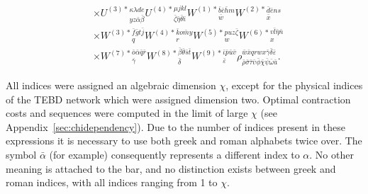 \documentclass[aps,pre,reprint,superscriptaddress,amsfonts,amsmath,showpacs,nofootinbib,floatfix]{revtex4-1}
\newcommand{\aref}[1]{Appendix~\ref{#1}}
\begin{document}
\begin{itemize}
\begin{equation}
\begin{split}
\\
&\times U^{(3)*}{}^{\kappa\lambda de}_{yz\bar\alpha\bar\beta} U^{(4)*}{}^{\mu jkl}_{\bar\zeta\bar\eta\bar\theta\bar\iota}W^{(1)*}{}^{\bar b\bar c\bar h m}_{\bar w} W^{(2)*}{}^{\bar d\bar e ns}_{\bar x}  \\
&\times W^{(3)*}{}^{\bar f\bar g t\bar j}_qW^{(4)*}{}^{\bar k o \bar m y}_r W^{(5)*}{}^{puz\bar\zeta}_w W^{(6)*}{}^{v\bar l\bar\eta\bar n}_x  \\
&\times W^{(7)*}{}^{\bar o\bar\alpha\bar q\bar r}_{\bar\gamma}W^{(8)*}{}^{\bar\beta\bar\theta\bar s\bar t}_{\bar\delta}W^{(9)*}{}^{\bar\iota\bar p\bar u\bar v}_{\bar\varepsilon}\rho^{\bar w\bar x q r w x \bar\gamma\bar\delta\bar\varepsilon}_{\bar\rho\bar\sigma\bar\tau\bar\upsilon\bar\phi\bar\chi\bar\psi\bar\omega\bar a}
\label{eq:2DTN2}.
\end{split}
\end{equation}
\end{itemize}
All indices were assigned an algebraic dimension $\chi$, except for the physical indices of the TEBD network which were assigned dimension two. Optimal contraction costs and sequences were computed in the limit of large $\chi$ (see \aref{sec:chidependency}). %
Due to the number of indices present in these expressions it is necessary to use both greek and roman alphabets twice over. The symbol $\bar{\alpha}$ (for example) consequently represents a different index to $\alpha$. No other meaning is attached to the bar, and no distinction exists between greek and roman indices, with all indices ranging from 1 to $\chi$.
\end{document}
